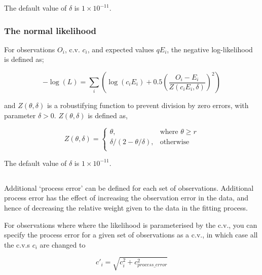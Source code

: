 {{{{The default value of $\delta$ is $1 \times 10^{-11}$.

\subsubsection*{The normal likelihood}

For observations $O_i$, c.v. $c_i$, and expected values $qE_i$, the negative log-likelihood is defined as;

\begin{equation}
 - \log \left(L \right) = \sum\limits_i \left( \log \left( c_i E_i \right) +0.5 \left( \frac{O_i-E_i}{Z\left(c_i E_i,\delta \right)}\right)^2\right)
\end{equation}

and $Z \left(\theta,\delta \right)$ is a robustifying function to prevent division by zero errors, with parameter $\delta>0$. $Z \left(\theta,\delta \right)$ is defined as,

\begin{equation}
   Z \left(\theta,\delta \right) = \begin{cases}
	  \theta, & \text{where $\theta \ge r$} \\
	  \delta/\left( 2-\theta/\delta \right), & \text{otherwise} \\  
  \end{cases}
\end{equation}

The default value of $\delta$ is $1 \times 10^{-11}$.

\subsection{}

Additional `process error' can be defined for each set of observations. Additional process error has the effect of increasing the observation error in the data, and hence of decreasing the relative weight given to the data in the fitting process. 

For observations where where the likelihood is parameterised by the c.v., you can specify the process error for a given set of observations as a c.v., in which case all the c.v.s $c_i$ are changed to

\begin{equation}
  c'_i  = \sqrt {c_i^2  + c_{process\_error}^2 } 
\end{equation}

}}}}
